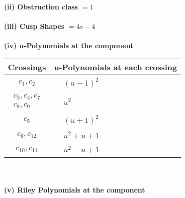 \documentclass[1p]{elsarticle_modified}
\theoremstyle{definition}
\begin{document}
\flushleft \textbf{(ii) Obstruction class $= 1$}\\~\\
\flushleft \textbf{(iii) Cusp Shapes $= 4 v-4$}\\~\\
\newpage\renewcommand{\arraystretch}{1}
\flushleft \textbf{(iv) u-Polynomials at the component}\newline \\
\begin{tabular}{m{50pt}|m{274pt}}
Crossings & \hspace{64pt}u-Polynomials at each crossing \\
\hline $$\begin{aligned}c_{1},c_{2}\end{aligned}$$&$\begin{aligned}
&(u-1)^2
\end{aligned}$\\
\hline $$\begin{aligned}c_{3},c_{4},c_{7}\\c_{8},c_{9}\end{aligned}$$&$\begin{aligned}
&u^2
\end{aligned}$\\
\hline $$\begin{aligned}c_{5}\end{aligned}$$&$\begin{aligned}
&(u+1)^2
\end{aligned}$\\
\hline $$\begin{aligned}c_{6},c_{12}\end{aligned}$$&$\begin{aligned}
&u^2+u+1
\end{aligned}$\\
\hline $$\begin{aligned}c_{10},c_{11}\end{aligned}$$&$\begin{aligned}
&u^2- u+1
\end{aligned}$\\
\hline
\end{tabular}\\~\\
\newpage\renewcommand{\arraystretch}{1}
\flushleft \textbf{(v) Riley Polynomials at the component}\newline \\
\end{document}
